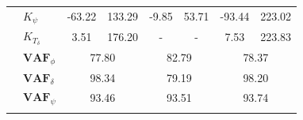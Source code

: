 \begin{table}[]
\begin{tabular}{llcccccc}
                                                   & $K_\psi $                                                          & -63.22                                      & 133.29                                              & -9.85                                       & 53.71                                               & -93.44                                      & 223.02                                              \\
                                                   & $K_{T_\delta}$                                                     & 3.51                                        & 176.20                                              & -                                           & -                                                   & 7.53                                        & 223.83                                              \\ \cline{2-8} 
                                                   & $\mathbf{VAF}_\phi$                                                & \multicolumn{2}{c}{77.80}                                                                         & \multicolumn{2}{c}{82.79}                                                                         & \multicolumn{2}{c}{78.37}                                                                         \\
                                                   & $\mathbf{VAF}_\delta$                                              & \multicolumn{2}{c}{98.34}                                                                         & \multicolumn{2}{c}{79.19}                                                                         & \multicolumn{2}{c}{98.20}                                                                         \\
                                                   & $\mathbf{VAF}_\psi$                                                & \multicolumn{2}{c}{93.46}                                                                         & \multicolumn{2}{c}{93.51}                                                                         & \multicolumn{2}{c}{93.74}                                                                         \\
                                                   &                                                                    & \multicolumn{1}{l}{}                        & \multicolumn{1}{l}{}                                & \multicolumn{1}{l}{}                        & \multicolumn{1}{l}{}                                & \multicolumn{1}{l}{}                        & \multicolumn{1}{l}{}                                \\ \hline

\end{tabular}
\end{table}
